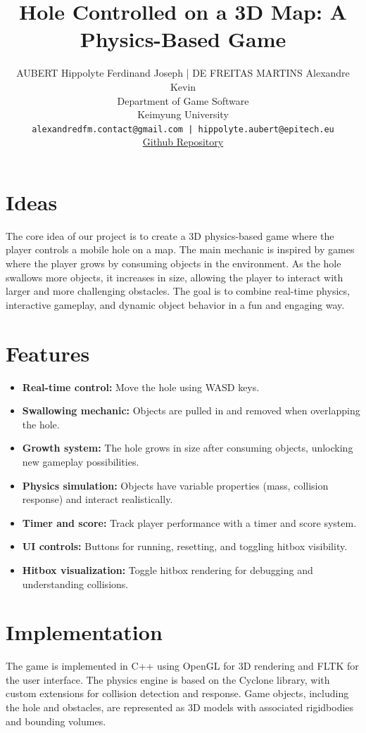 \documentclass[a4paper, 10 pt]{article}
\title{\LARGE \bf
Hole Controlled on a 3D Map: A Physics-Based Game
}
\author{AUBERT Hippolyte Ferdinand Joseph | DE FREITAS MARTINS Alexandre Kevin \\
Department of Game Software \\
Keimyung University \\
\texttt{alexandredfm.contact@gmail.com | hippolyte.aubert@epitech.eu} \\
\href{https://github.com/AlexandreDFM/ComputerGraphics_physical_finalProject}{Github Repository}}
\begin{document}
\maketitle
\thispagestyle{plain}
\pagestyle{plain}

\section*{Ideas}
The core idea of our project is to create a 3D physics-based game where the player controls a mobile hole on a map. The main mechanic is inspired by games where the player grows by consuming objects in the environment. As the hole swallows more objects, it increases in size, allowing the player to interact with larger and more challenging obstacles. The goal is to combine real-time physics, interactive gameplay, and dynamic object behavior in a fun and engaging way.

\section*{Features}
\begin{itemize}
  \item \textbf{Real-time control:} Move the hole using WASD keys.
  \item \textbf{Swallowing mechanic:} Objects are pulled in and removed when overlapping the hole.
  \item \textbf{Growth system:} The hole grows in size after consuming objects, unlocking new gameplay possibilities.
  \item \textbf{Physics simulation:} Objects have variable properties (mass, collision response) and interact realistically.
  \item \textbf{Timer and score:} Track player performance with a timer and score system.
  \item \textbf{UI controls:} Buttons for running, resetting, and toggling hitbox visibility.
  \item \textbf{Hitbox visualization:} Toggle hitbox rendering for debugging and understanding collisions.
\end{itemize}

\section*{Implementation}
The game is implemented in C++ using OpenGL for 3D rendering and FLTK for the user interface. The physics engine is based on the Cyclone library, with custom extensions for collision detection and response. Game objects, including the hole and obstacles, are represented as 3D models with associated rigidbodies and bounding volumes.
\end{document}
